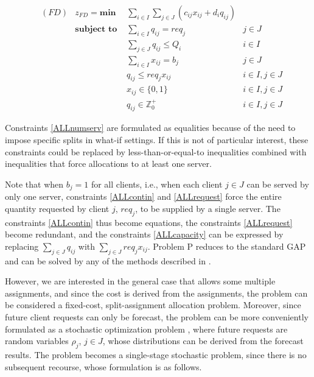\documentclass[ijoc,sglanonrev]{informs4}
\begin{document}
\begin{align}
&(FD) & z_{FD} = \textbf{min } & \sum_{i \in I} \sum_{j \in J} ( c_{ij}x_{ij} + d_i q_{ij} ) \label{ALLobj}\\
& &  \textbf{subject to }
     & \sum_{i \in I} q_{ij} = req_j & j \in J  \label{ALLrequest}\\
& &  & \sum_{j \in J}q_{ij} \leq Q_i & i \in I \label{ALLcapacity}\\
& &  & \sum_{i \in I} x_{ij} = b_j & j \in J  \label{ALLnumserv}\\
& &  & q_{ij} \leq req_j x_{ij} & i \in I, j \in J \label{ALLcontin}\\
& &  & x_{ij} \in \{0,1\} & i\in I, j \in J \label{ALLx}\\
& &  & q_{ij} \in \mathbb{Z}^+_0 & i\in I, j \in J \label{ALLq}
\end{align}

Constraints \ref{ALLnumserv} are formulated as equalities because of the need to impose specific splits in what-if settings. If this is not of particular interest, these constraints could be replaced by less-than-or-equal-to inequalities combined with inequalities that force allocations to at least one server.

Note that when $b_j = 1$ for all clients, i.e., when each client $j \in J$ can be served by only one server, constraints \ref{ALLcontin} and \ref{ALLrequest} force the entire quantity requested by client $j$, $req_j$, to be supplied by a single server. The constraints \ref{ALLcontin} thus become equations, the constraints \ref{ALLrequest} become redundant, and the constraints \ref{ALLcapacity} can be expressed by replacing $\sum_{j \in J}q_{ij}$ with $\sum_{j \in J}req_j x_{ij}$. Problem P reduces to the standard GAP and can be solved by any of the methods described in \citet{matheuristics}.

However, we are interested in the general case that allows some multiple assignments, and since the cost is derived from the assignments, the problem can be considered a fixed-cost, split-assignment allocation problem.
Moreover, since future client requests can only be forecast, the problem can be more conveniently formulated as a stochastic optimization problem \citep{KM10,BL11}, where future requests are random variables $\rho_j$, $j \in J$, whose distributions can be derived from the forecast results. The problem becomes a single-stage stochastic problem, since there is no subsequent recourse, whose formulation is as follows.
\end{document}
